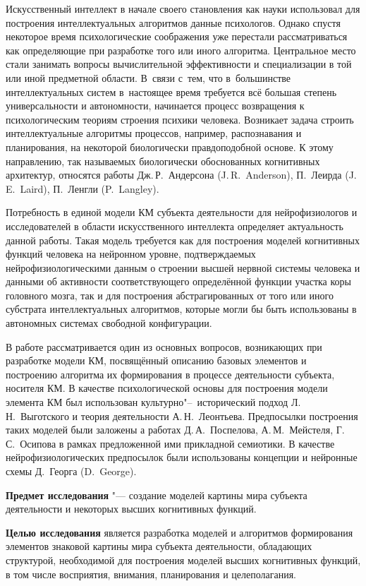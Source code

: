 Искусственный интеллект в начале своего становления как науки использовал для построения интеллектуальных алгоритмов данные психологов. Однако спустя некоторое время психологические соображения уже перестали рассматриваться как определяющие при разработке того или иного алгоритма. Центральное место стали занимать вопросы вычислительной эффективности и специализации в той или иной предметной области. В~связи с~тем, что в~большинстве интеллектуальных систем в~настоящее время требуется всё большая степень универсальности и автономности, начинается процесс возвращения к психологическим теориям строения психики человека. Возникает задача строить интеллектуальные алгоритмы процессов, например, распознавания и планирования, на некоторой биологически правдоподобной основе. К этому направлению, так называемых биологически обоснованных когнитивных архитектур, относятся работы Дж.\,Р.~Андерсона (J.\,R.~Anderson), П.~Леирда (J.\,E.~Laird), П.~Ленгли (P.~Langley).

Потребность в единой модели КМ субъекта деятельности для нейрофизиологов и исследователей в области искусственного интеллекта определяет актуальность данной работы. Такая модель требуется как для построения моделей когнитивных функций человека на нейронном уровне, подтверждаемых нейрофизиологическими данным о строении высшей нервной системы человека и данными об активности соответствующего определённой функции участка коры головного мозга, так и для построения абстрагированных от того или иного субстрата интеллектуальных алгоритмов, которые могли бы быть использованы в автономных системах свободной конфигурации.

В работе рассматривается один из основных вопросов, возникающих при разработке модели КМ, посвящённый описанию базовых элементов и построению алгоритма их формирования в процессе деятельности субъекта, носителя КМ. В качестве психологической основы для построения модели элемента КМ был использован культурно"--~исторический подход Л.\,Н.~Выготского и теория деятельности А.\,Н.~Леонтьева. Предпосылки построения таких моделей были заложены а работах Д.\,А.~Поспелова, А.\,М.~Мейстеля, Г.\,С.~Осипова в рамках предложенной ими прикладной семиотики. В качестве нейрофизиологических предпосылок были использованы концепции и нейронные схемы Д.~Георга (D.~George).

\textbf{Предмет исследования} "--- создание моделей картины мира субъекта деятельности и некоторых высших когнитивных функций.

\textbf{Целью исследования} является разработка моделей и алгоритмов формирования элементов знаковой картины мира субъекта деятельности, обладающих структурой, необходимой для построения моделей высших когнитивных функций, в том числе восприятия, внимания, планирования и целеполагания.

